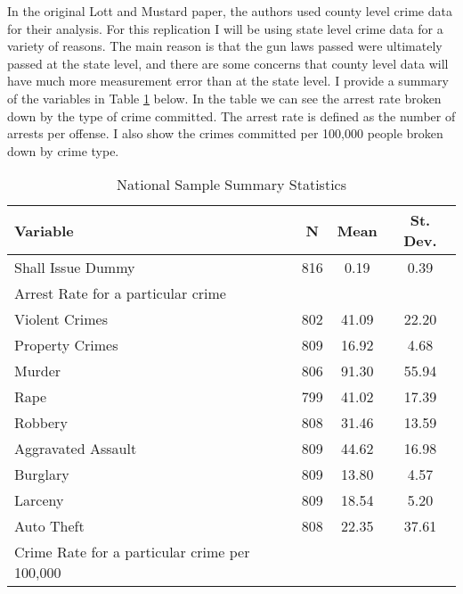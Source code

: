 \documentclass{article}
\begin{document}
In the original Lott and Mustard paper, the authors used county level crime data for their analysis. For this replication I will be using state level crime data for a variety of reasons. The main reason is that the gun laws passed were ultimately passed at the state level, and there are some concerns that county level data will have much more measurement error than at the state level. I provide a summary of the variables in Table \ref{tab:summary} below. In the table we can see the arrest rate broken down by the type of crime committed. The arrest rate is defined as the number of arrests per offense. I also show the crimes committed per 100,000 people broken down by crime type. 
\begin{table}[H] \centering 
  \caption{National Sample Summary Statistics} 
  \label{tab:summary} 
\begin{tabular}[h]{@{\extracolsep{5pt}}lccc}
\toprule 
Variable & \multicolumn{1}{c}{N} & \multicolumn{1}{c}{Mean} & \multicolumn{1}{c}{St. Dev.} \\ 
\midrule
Shall Issue Dummy & 816 & 0.19 & 0.39 \\ 
Arrest Rate for a particular crime &&&\\
\hspace{3mm}Violent Crimes & 802 & 41.09 & 22.20 \\ 
\hspace{3mm}Property Crimes & 809 & 16.92 & 4.68 \\ 
\hspace{3mm}Murder & 806 & 91.30 & 55.94 \\ 
\hspace{3mm}Rape & 799 & 41.02 & 17.39 \\ 
\hspace{3mm}Robbery & 808 & 31.46 & 13.59 \\ 
\hspace{3mm}Aggravated Assault & 809 & 44.62 & 16.98 \\ 
\hspace{3mm}Burglary & 809 & 13.80 & 4.57 \\ 
\hspace{3mm}Larceny & 809 & 18.54 & 5.20 \\ 
\hspace{3mm}Auto Theft & 808 & 22.35 & 37.61 \\ 
Crime Rate for a particular crime per 100,000 &&&\\

\end{tabular}
\end{table}
\end{document}
